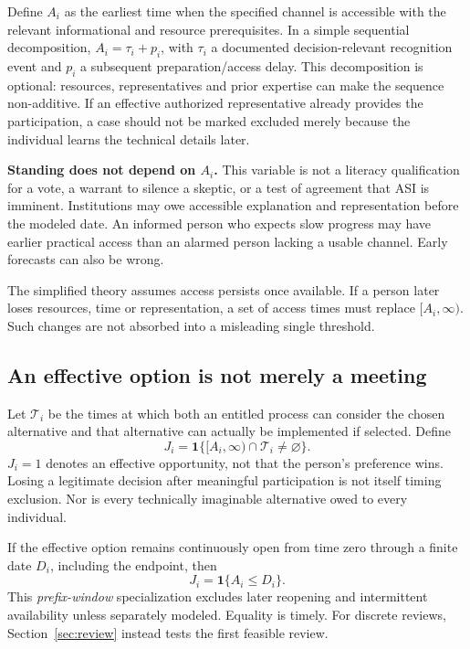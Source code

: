 \documentclass[11pt,a4paper]{article}
\theoremstyle{definition}\newtheorem{definition}{Definition}
\newcommand{\ind}{\mathbf 1}\newcommand{\pos}[1]{\left[#1\right]_+}
\begin{document}
Define $A_i$ as the earliest time when the specified channel is accessible with the relevant informational and resource prerequisites. In a simple sequential decomposition, $A_i=\tau_i+p_i$, with $\tau_i$ a documented decision-relevant recognition event and $p_i$ a subsequent preparation/access delay. This decomposition is optional: resources, representatives and prior expertise can make the sequence non-additive. If an effective authorized representative already provides the participation, a case should not be marked excluded merely because the individual learns the technical details later.

\textbf{Standing does not depend on $A_i$.} This variable is not a literacy qualification for a vote, a warrant to silence a skeptic, or a test of agreement that ASI is imminent. Institutions may owe accessible explanation and representation before the modeled date. An informed person who expects slow progress may have earlier practical access than an alarmed person lacking a usable channel. Early forecasts can also be wrong.

The simplified theory assumes access persists once available. If a person later loses resources, time or representation, a set of access times must replace $[A_i,\infty)$. Such changes are not absorbed into a misleading single threshold.

\subsection{An effective option is not merely a meeting}
Let $\mathcal T_i$ be the times at which both an entitled process can consider the chosen alternative and that alternative can actually be implemented if selected. Define
\begin{equation}
J_i=\ind\{[A_i,\infty)\cap\mathcal T_i\ne\varnothing\}.
\label{eq:general}
\end{equation}
$J_i=1$ denotes an effective opportunity, not that the person's preference wins. Losing a legitimate decision after meaningful participation is not itself timing exclusion. Nor is every technically imaginable alternative owed to every individual.

If the effective option remains continuously open from time zero through a finite date $D_i$, including the endpoint, then
\begin{equation}
\boxed{J_i=\ind\{A_i\le D_i\}.}
\label{eq:basic}
\end{equation}
This \emph{prefix-window} specialization excludes later reopening and intermittent availability unless separately modeled. Equality is timely. For discrete reviews, Section~\ref{sec:review} instead tests the first feasible review.
\end{document}
